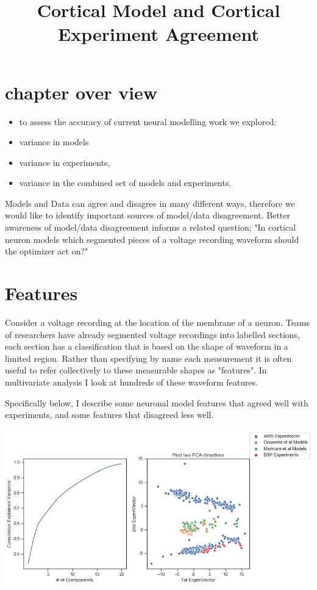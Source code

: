 
\section{chapter over view}
\begin{itemize}

\item to assess the accuracy of current neural modelling work we explored:
\item variance in models
\item variance in experiments,  
\item variance in the combined set of models and experiments.


\end{itemize}


\title{Cortical Model and Cortical Experiment Agreement}
Models and Data can agree and disagree in many different ways, therefore we would like to identify important sources of model/data disagreement. Better awareness of model/data disagreement informs a related question: "In  cortical neuron models which segmented pieces of a voltage recording waveform should the optimizer act on?"

\section{Features} Consider a voltage recording at the location of the membrane of a neuron. Teams of researchers have already segmented voltage recordings into labelled sections, each section has a classification that is based on the shape of waveform in a limited region. Rather than specifying by name each measurement it is often useful to refer collectively to these measurable shapes as "features". In multivariate analysis I look at hundreds of these waveform features. 

Specifically below, I describe some neuronal model features that agreed well with experiments, and some features that disagreed less well.
    
\begin{center}

\includegraphics[width=0.7\linewidth]{figures/cortical_model_data_agreement_52_1.png}
\end{center}

